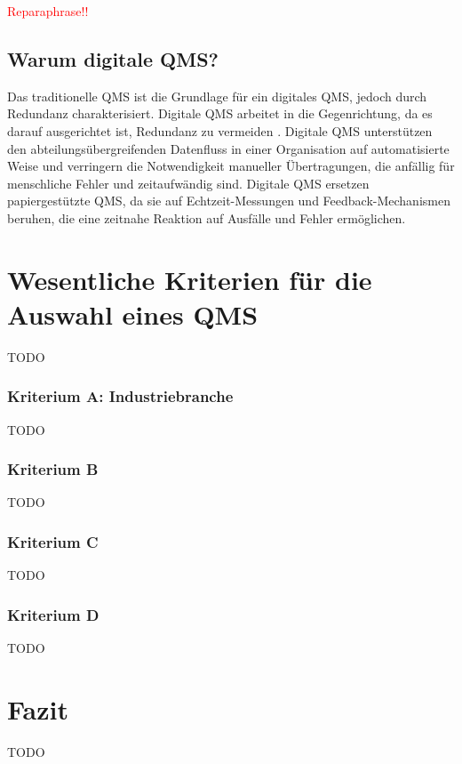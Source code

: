 \documentclass[11pt]{scrartcl}       %
\begin{document}



\textcolor{red}{Reparaphrase!!}

\subsection{Warum digitale QMS?}
Das traditionelle QMS ist die Grundlage für ein digitales QMS, jedoch durch Redundanz charakterisiert. Digitale QMS arbeitet in die Gegenrichtung, da es darauf ausgerichtet ist, Redundanz zu vermeiden \cite{ibrahim2019digital}. Digitale QMS unterstützen den abteilungsübergreifenden Datenfluss in einer Organisation auf automatisierte Weise und verringern die Notwendigkeit manueller Übertragungen, die anfällig für menschliche Fehler und zeitaufwändig sind. Digitale QMS ersetzen papiergestützte QMS, da sie auf Echtzeit-Messungen und Feedback-Mechanismen beruhen, die eine zeitnahe Reaktion auf Ausfälle und Fehler ermöglichen. \cite{yeung2003empirical}


\section{Wesentliche Kriterien für die Auswahl eines QMS}

TODO

\subsubsection{Kriterium A: Industriebranche}

TODO



\subsubsection{Kriterium B}

TODO



\subsubsection{Kriterium C}

 TODO



\subsubsection{Kriterium D}

 TODO



\section{Fazit}

 TODO



\newpage
{}
{}
\printbibliography
\end{document}
